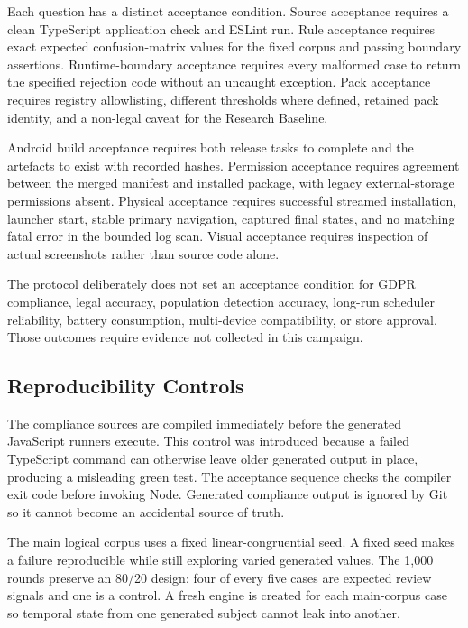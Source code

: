 Each question has a distinct acceptance condition. Source acceptance requires a clean TypeScript application check and ESLint run. Rule acceptance requires exact expected confusion-matrix values for the fixed corpus and passing boundary assertions. Runtime-boundary acceptance requires every malformed case to return the specified rejection code without an uncaught exception. Pack acceptance requires registry allowlisting, different thresholds where defined, retained pack identity, and a non-legal caveat for the Research Baseline.

Android build acceptance requires both release tasks to complete and the artefacts to exist with recorded hashes. Permission acceptance requires agreement between the merged manifest and installed package, with legacy external-storage permissions absent. Physical acceptance requires successful streamed installation, launcher start, stable primary navigation, captured final states, and no matching fatal error in the bounded log scan. Visual acceptance requires inspection of actual screenshots rather than source code alone.

The protocol deliberately does not set an acceptance condition for GDPR compliance, legal accuracy, population detection accuracy, long-run scheduler reliability, battery consumption, multi-device compatibility, or store approval. Those outcomes require evidence not collected in this campaign.

\subsection{Reproducibility Controls}

The compliance sources are compiled immediately before the generated JavaScript runners execute. This control was introduced because a failed TypeScript command can otherwise leave older generated output in place, producing a misleading green test. The acceptance sequence checks the compiler exit code before invoking Node. Generated compliance output is ignored by Git so it cannot become an accidental source of truth.

The main logical corpus uses a fixed linear-congruential seed. A fixed seed makes a failure reproducible while still exploring varied generated values. The 1,000 rounds preserve an 80/20 design: four of every five cases are expected review signals and one is a control. A fresh engine is created for each main-corpus case so temporal state from one generated subject cannot leak into another.

